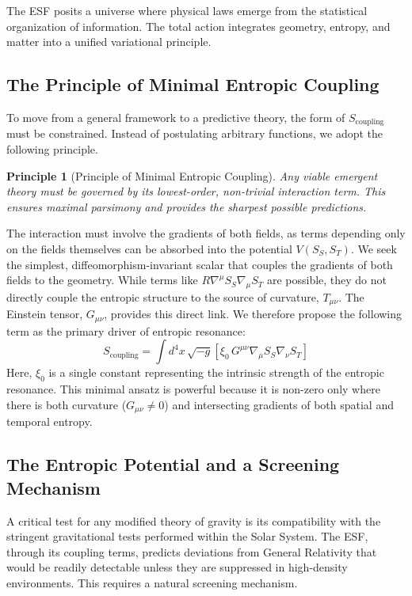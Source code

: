 \documentclass[12pt, a4paper]{article}
\newtheorem{principle}{Principle}[section]
\begin{document}
The ESF posits a universe where physical laws emerge from the statistical organization of information. The total action integrates geometry, entropy, and matter into a unified variational principle.

\subsection{The Principle of Minimal Entropic Coupling}
\label{sec:minimal_coupling}
To move from a general framework to a predictive theory, the form of \(S_{\mathrm{coupling}}\) must be constrained. Instead of postulating arbitrary functions, we adopt the following principle.
\begin{principle}[Principle of Minimal Entropic Coupling]
Any viable emergent theory must be governed by its lowest-order, non-trivial interaction term. This ensures maximal parsimony and provides the sharpest possible predictions.
\end{principle}

The interaction must involve the gradients of both fields, as terms depending only on the fields themselves can be absorbed into the potential \(V(S_S,S_T)\). We seek the simplest, diffeomorphism-invariant scalar that couples the gradients of both fields to the geometry. While terms like \(R \nabla^\mu S_S \nabla_\mu S_T\) are possible, they do not directly couple the entropic structure to the source of curvature, \(T_{\mu\nu}\). The Einstein tensor, \(G_{\mu\nu}\), provides this direct link. We therefore propose the following term as the primary driver of entropic resonance:
\begin{equation}
S_{\mathrm{coupling}} = \int d^4 x\, \sqrt{-g} \left[ \xi_0 \, G^{\mu\nu} \nabla_\mu S_S \nabla_\nu S_T \right]
\end{equation}
Here, \(\xi_0\) is a single constant representing the intrinsic strength of the entropic resonance. This minimal ansatz is powerful because it is non-zero only where there is both curvature (\(G_{\mu\nu} \neq 0\)) and intersecting gradients of both spatial and temporal entropy.

\subsection{The Entropic Potential and a Screening Mechanism}
\label{sec:screening}
A critical test for any modified theory of gravity is its compatibility with the stringent gravitational tests performed within the Solar System. The ESF, through its coupling terms, predicts deviations from General Relativity that would be readily detectable unless they are suppressed in high-density environments. This requires a natural screening mechanism.
\end{document}

